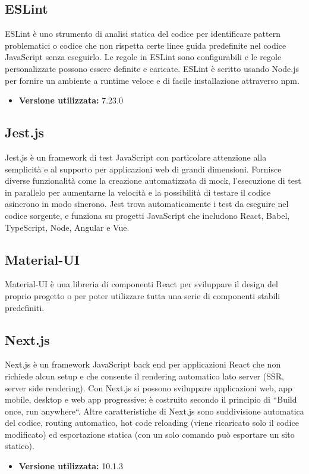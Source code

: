\subsection{ESLint}
ESLint è uno strumento di analisi statica del codice per identificare pattern problematici o codice che non rispetta certe linee guida predefinite nel codice JavaScript senza eseguirlo.
Le regole in ESLint sono configurabili e le regole personalizzate possono essere definite e caricate. ESLint è scritto usando Node.js per fornire un ambiente a runtime veloce e di facile installazione attraverso npm.
\begin{itemize}
    \item \textbf{Versione utilizzata:} 7.23.0
\end{itemize}
\subsection{Jest.js}
Jest.js è un framework di test JavaScript con particolare attenzione alla semplicità e al supporto per applicazioni web di grandi dimensioni. Fornisce diverse funzionalità come la creazione automatizzata di mock, l'esecuzione di test in parallelo per aumentarne la velocità e la possibilità di testare il codice asincrono in modo sincrono.
Jest trova automaticamente i test da eseguire nel codice sorgente, e funziona su progetti JavaScript che includono React, Babel, TypeScript, Node, Angular e Vue.
\subsection{Material-UI}
Material-UI è una libreria di componenti React per sviluppare il design del proprio progetto o per poter utilizzare tutta una serie di componenti stabili predefiniti.
\subsection{Next.js}
Next.js è un framework JavaScript back end per applicazioni React che non richiede alcun setup e che consente il rendering automatico lato server (SSR, server side rendering).
Con Next.js si possono sviluppare applicazioni web, app mobile, desktop e web app progressive: è costruito secondo il principio di “Build once, run anywhere“.
Altre caratteristiche di Next.js sono suddivisione automatica del codice, routing automatico, hot code reloading (viene ricaricato solo il codice modificato) ed esportazione statica (con un solo comando può esportare un sito statico).
\begin{itemize}
    \item \textbf{Versione utilizzata:} 10.1.3
\end{itemize}
